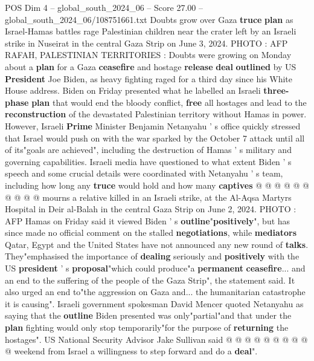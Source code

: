\begin{textsample}{POS Dim 4 – global\_south\_2024\_06 – Score 27.00 – global\_south\_2024\_06/108751661.txt}  \label{ex:f4_pos_081}
Doubts grow over Gaza \textbf{truce} \textbf{plan} as Israel-Hamas battles rage Palestinian children near the crater left by an Israeli strike in Nuseirat in the central Gaza Strip on June 3, 2024.
PHOTO : AFP RAFAH, PALESTINIAN TERRITORIES : Doubts were growing on Monday about a \textbf{plan} for a Gaza \textbf{ceasefire} and hostage \textbf{release} \textbf{deal} \textbf{outlined} by US \textbf{President} Joe Biden, as heavy fighting raged for a third day since his White House address.
Biden on Friday presented what he labelled an Israeli \textbf{three-phase} \textbf{plan} that would end the bloody conflict, \textbf{free} all hostages and lead to the \textbf{reconstruction} of the devastated Palestinian territory without Hamas in power.
However, Israeli \textbf{Prime} Minister Benjamin Netanyahu ' s office quickly stressed that Israel would push on with the war sparked by the October 7 attack until all of its"goals are achieved", including the destruction of Hamas ' s military and governing capabilities.
Israeli media have questioned to what extent Biden ' s speech and some crucial details were coordinated with Netanyahu ' s team, including how long any \textbf{truce} would hold and how many \textbf{captives} @ @ @ @ @ @ @ @ @ @ mourns a relative killed in an Israeli strike, at the Al-Aqsa Martyrs Hospital in Deir al-Balah in the central Gaza Strip on June 2, 2024.
PHOTO : AFP Hamas on Friday said it viewed Biden ' s \textbf{outline}"\textbf{positively}", but has since made no official comment on the stalled \textbf{negotiations}, while \textbf{mediators} Qatar, Egypt and the United States have not announced any new round of \textbf{talks}.
They"emphasised the importance of \textbf{dealing} seriously and \textbf{positively} with the US \textbf{president} ' s \textbf{proposal}"which could produce"a \textbf{permanent} \textbf{ceasefire}... and an end to the suffering of the people of the Gaza Strip", the statement said.
It also urged an end to"the aggression on Gaza and... the humanitarian catastrophe it is causing".
Israeli government spokesman David Mencer quoted Netanyahu as saying that the \textbf{outline} Biden presented was only"partial"and that under the \textbf{plan} fighting would only stop temporarily"for the purpose of \textbf{returning} the hostages".
US National Security Advisor Jake Sullivan said @ @ @ @ @ @ @ @ @ @ weekend from Israel a willingness to step forward and do a \textbf{deal}".

\end{textsample}
